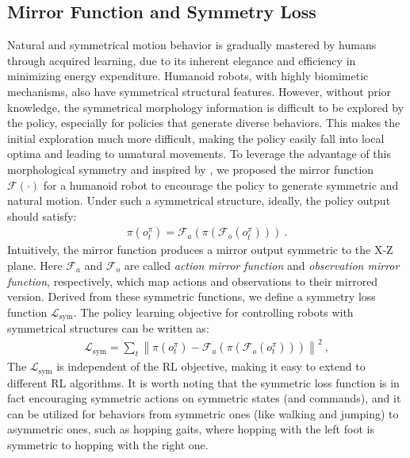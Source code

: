 \subsection{Mirror Function and Symmetry Loss}
Natural and symmetrical motion behavior is gradually mastered by humans through acquired learning, due to its inherent elegance and efficiency in minimizing energy expenditure. Humanoid robots, with highly biomimetic mechanisms, also have symmetrical structural features.
However, without prior knowledge, the symmetrical morphology information is difficult to be explored by the policy, especially for policies that generate diverse behaviors. This makes the initial exploration much more difficult, making the policy easily fall into local optima and leading to unnatural movements.
To leverage the advantage of this morphological symmetry and inspired by \cite{symmetry2018tog}, we proposed the mirror function $\mathcal{F} \left( \cdot \right)$ for a humanoid robot to encourage the policy to generate symmetric and natural motion. Under such a symmetrical structure, ideally, the policy output should satisfy:
\begin{equation}
\begin{aligned}
\pi (o_t^{\pi}) = \mathcal{F}_a (\pi(\mathcal{F}_o (o_t^{\pi}))) ~.
\end{aligned}
\end{equation}
Intuitively, the mirror function produces a mirror output symmetric to the X-Z plane.
Here $\mathcal{F}_a$ and $\mathcal{F}_o$ are called \textit{action mirror function} and \textit{observation mirror function}, respectively, which map actions and observations to their mirrored version. Derived from these symmetric functions, we define a symmetry loss function $\mathcal{L}_\text{sym}$. The policy learning objective for controlling robots with symmetrical structures can be written as:
\begin{equation}\label{eq:sym-obj}
\begin{aligned}
\mathcal{L}_\text{sym} = \sum_t\left\| \pi \left({o^{\pi}_t} \right) - \mathcal{F}_{a} \left( \pi \left( \mathcal{F}_{o}  \left( {o^{\pi}_t}\right) \right) \right) \right\|^2~,
\end{aligned}
\end{equation}
The $\mathcal{L}_\text{sym}$ is independent of the RL objective, making it easy to extend to different RL algorithms. 
It is worth noting that the symmetric loss function is in fact encouraging symmetric actions on symmetric states (and commands), and it can be utilized for behaviors from symmetric ones (like walking and jumping) to asymmetric ones, such as hopping gaits, where hopping with the left foot is symmetric to hopping with the right one.

